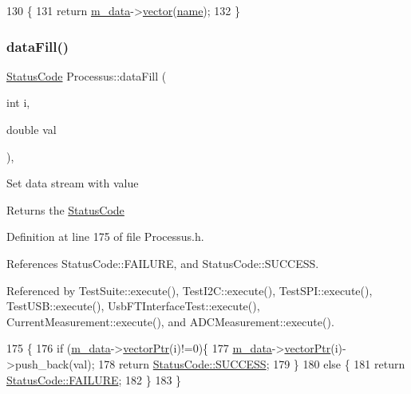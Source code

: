 \begin{DoxyCode}
130                                         \{
131     \textcolor{keywordflow}{return} \hyperlink{classProcessus_a3da9a9de8af54e2f47807a3e09dfccff}{m\_data}->\hyperlink{classData_a94e00cdd58c1d6f11487f1ac47fee4bc}{vector}(\hyperlink{classObject_a300f4c05dd468c7bb8b3c968868443c1}{name});
132   \}
\end{DoxyCode}
\mbox{\label{classProcessus_a0d093b48f3218a088ba030e24372f18c}} 
\subsubsection{\texorpdfstring{data\+Fill()}{dataFill()}\hspace{0.1cm}{\footnotesize\ttfamily [1/2]}}
{\footnotesize\ttfamily \hyperlink{classStatusCode}{Status\+Code} Processus\+::data\+Fill (\begin{DoxyParamCaption}\item[{int}]{i,  }\item[{double}]{val }\end{DoxyParamCaption})\hspace{0.3cm}{\ttfamily [inline]}, {\ttfamily [inherited]}}

Set data stream with value \begin{DoxyReturn}{Returns}
the \hyperlink{classStatusCode}{Status\+Code} 
\end{DoxyReturn}


Definition at line 175 of file Processus.\+h.



References Status\+Code\+::\+F\+A\+I\+L\+U\+RE, and Status\+Code\+::\+S\+U\+C\+C\+E\+SS.



Referenced by Test\+Suite\+::execute(), Test\+I2\+C\+::execute(), Test\+S\+P\+I\+::execute(), Test\+U\+S\+B\+::execute(), Usb\+F\+T\+Interface\+Test\+::execute(), Current\+Measurement\+::execute(), and A\+D\+C\+Measurement\+::execute().


\begin{DoxyCode}
175                                         \{
176     \textcolor{keywordflow}{if} (\hyperlink{classProcessus_a3da9a9de8af54e2f47807a3e09dfccff}{m\_data}->\hyperlink{classData_aa2153cb57f6f1a67b54eafe5582e0b6b}{vectorPtr}(i)!=0)\{
177       \hyperlink{classProcessus_a3da9a9de8af54e2f47807a3e09dfccff}{m\_data}->\hyperlink{classData_aa2153cb57f6f1a67b54eafe5582e0b6b}{vectorPtr}(i)->push\_back(val);
178       \textcolor{keywordflow}{return} \hyperlink{classStatusCode_a6f565cbeadc76d14c72f047e5e85eb4badd0da38d3ba0d922efd1f4619bc37ad8}{StatusCode::SUCCESS};
179     \}
180     \textcolor{keywordflow}{else} \{
181       \textcolor{keywordflow}{return} \hyperlink{classStatusCode_a6f565cbeadc76d14c72f047e5e85eb4ba3da73d4c469762eb9d3c960368252b26}{StatusCode::FAILURE};
182     \}
183   \}
\end{DoxyCode}
\mbox{\label{classProcessus_aa31ab71711f7af6a729441ff573f69c9}} 
